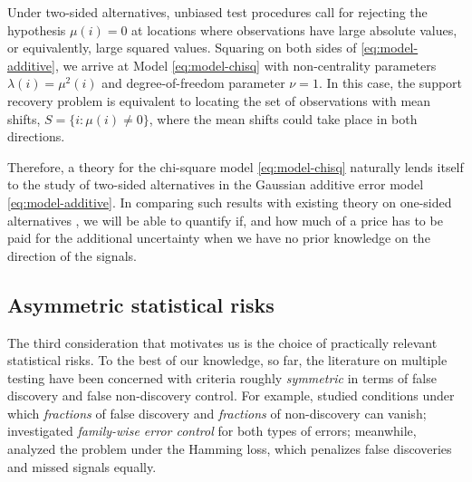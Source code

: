 Under two-sided alternatives, unbiased test procedures call for rejecting the hypothesis $\mu(i)=0$ at locations where observations have large absolute values, or equivalently, large squared values.
Squaring on both sides of \eqref{eq:model-additive}, we arrive at Model \eqref{eq:model-chisq} with non-centrality parameters $\lambda(i) = \mu^2(i)$ and degree-of-freedom parameter $\nu =1$.
In this case, the support recovery problem is equivalent to locating the set of observations with mean shifts, $S=\{i:\mu(i)\neq 0\}$, where the mean shifts could take place in both directions.

Therefore, a theory for the chi-square model \eqref{eq:model-chisq} naturally lends itself to the study of two-sided alternatives in the Gaussian additive error model \eqref{eq:model-additive}.
In comparing such results with existing theory on one-sided alternatives \cite{arias2017distribution, gao2018fundamental}, we will be able to quantify if, and how much of a price has to be paid for the additional uncertainty when we have no prior knowledge on the direction of the signals.


\subsection{Asymmetric statistical risks}
\label{subsec:asymmetric-risk}

The third consideration that motivates us is the choice of practically relevant statistical risks.
To the best of our knowledge, so far, the literature on multiple testing have been concerned with criteria roughly \emph{symmetric} in terms of false discovery and false non-discovery control.
For example, \citet{arias2017distribution} studied conditions under which \emph{fractions} of false discovery and \emph{fractions} of non-discovery can vanish; \citet{gao2018fundamental} investigated \emph{family-wise error control} for both types of errors; meanwhile, \citet{butucea2018variable} analyzed the problem under the Hamming loss, which penalizes false discoveries and missed signals {equally}.

